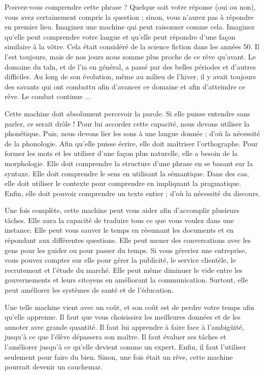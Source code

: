 \documentclass{KodeBook}
\begin{document}
\begin{discussion}

Pouvez-vous comprendre cette phrase ? 
Quelque soit votre réponse (oui ou non), vous avez certainement compris la question ; sinon, vous n'aurez pas à répondre en premier lieu. 
Imaginez une machine qui peut raisonner comme cela. 
Imaginez qu'elle peut comprendre votre langue et qu'elle peut répondre d'une façon similaire à la vôtre. 
Cela était considéré de la science fiction dans les années 50.
Il l'est toujours, mais de nos jours nous somme plus proche de ce rêve qu'avant. 
Le domaine du \ac{taln}, et de l'\ac{ia} en général, a passé par des belles périodes et d'autres difficiles. 
Au long de son évolution, même au milieu de l'hiver, il y avait toujours des savants qui ont combattu afin d'avancer ce domaine et afin d'atteindre ce rêve. 
Le combat continue ...

Cette machine doit absolument percevoir la parole.
Si elle puisse entendre sans parler, ce serait drôle !
Pour lui accorder cette capacité, nous devons utiliser la phonétique. 
Puis, nous devons lier les sons à une langue donnée ; d'où la nécessité de la phonologie.
Afin qu'elle puisse écrire, elle doit maîtriser l'orthographe.
Pour former les mots et les utiliser d'une façon plus naturelle, elle a besoin de la morphologie.
Elle doit comprendre la structure d'une phrase en se basant sur la syntaxe. 
Elle doit comprendre le sens en utilisant la sémantique.
Dans des cas, elle doit utiliser le contexte pour comprendre en impliquant la pragmatique. 
Enfin, elle doit pouvoir comprendre un texte entier ; d'où la nécessité du discours.

Une fois complète, cette machine peut vous aider afin d'accomplir plusieurs tâches. 
Elle aura la capacité de traduire tous ce que vous voulez dans une instance.
Elle peut vous sauver le temps en résumant les documents et en répondant aux différentes questions.
Elle peut mener des conversations avec les gens pour les guider ou pour passer du temps.
Si vous géreriez une entreprise, vous pouvez compter sur elle pour gérer la publicité, le service clientèle, le recrutement et l'étude du marché. 
Elle peut même diminuer le vide entre les gouvernements et leurs citoyens en améliorant la communication. 
Surtout, elle peut améliorer les systèmes de santé et de l'éducation.

Une telle machine vient avec un coût, et son coût est de perdre votre temps afin qu'elle apprenne. 
Il faut que vous choisissiez les meilleures données et de les annoter avec grande quantité. 
Il faut lui apprendre à faire face à l'ambigüité, jusqu'à ce que l'élève dépassera son maître.
Il faut évaluer ses tâches et l'améliorer jusqu'à ce qu'elle devient comme un expert. 
Enfin, il faut l'utiliser seulement pour faire du bien. 
Sinon, une fois était un rêve, cette machine pourrait devenir un cauchemar.

\end{discussion}

\ifx\wholebook\relax\else
% 
% 
	
\end{document}
